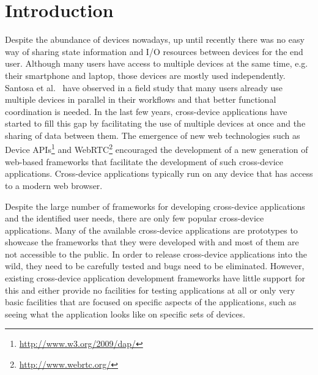 \chapter{Introduction}

Despite the abundance of devices nowadays, up until recently there was no easy way of sharing state information and I/O resources between devices for the end user. Although many users have access to multiple devices at the same time, e.g. their smartphone and laptop, those devices are mostly used independently. Santosa et al.~\cite{santosa2013} have observed in a field study that many users already use multiple devices in parallel in their workflows and that better functional coordination is needed. In the last few years, cross-device applications have started to fill this gap by facilitating the use of multiple devices at once and the sharing of data between them. The emergence of new web technologies such as Device APIs\footnote{\url{http://www.w3.org/2009/dap/}} and WebRTC\footnote{\url{http://www.webrtc.org/}} encouraged the development of a new generation of web-based frameworks that facilitate the development of such cross-device applications. Cross-device applications typically run on any device that has access to a modern web browser. 

Despite the large number of frameworks for developing cross-device applications and the identified user needs, there are only few popular cross-device applications. Many of the available cross-device applications are prototypes to showcase the frameworks that they were developed with and most of them are not accessible to the public. In order to release cross-device applications into the wild, they need to be carefully tested and bugs need to be eliminated. However, existing cross-device application development frameworks have little support for this and either provide no facilities for testing applications at all or only very basic facilities that are focused on specific aspects of the applications, such as seeing what the application looks like on specific sets of devices.

